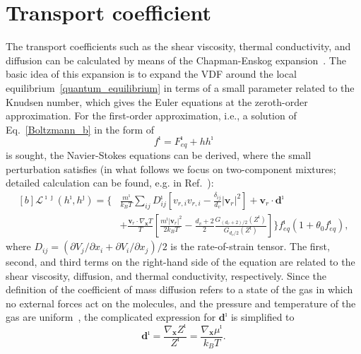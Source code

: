








\section{Transport coefficient}

The transport coefficients such as the shear viscosity, thermal conductivity, and diffusion can be calculated by means of the Chapman-Enskog expansion~\cite{CE}. The basic idea of this expansion is to expand the VDF around the local equilibrium~\eqref{quantum_equilibrium} in terms of a small parameter related to the Knudsen number, which gives the Euler equations at the zeroth-order approximation. For the first-order approximation, i.e., a solution of Eq.~\eqref{Boltzmann_b} in the form of 
\begin{equation}
f^\imath=F^\imath_{eq}+hh^\imath
\end{equation}
is sought, the Navier-Stokes equations can be derived, where the small perturbation satisfies (in what follows we focus on two-component mixtures; detailed calculation can be found, e.g. in Ref.~\cite{Watabe2010}):
\begin{equation*}%
\begin{aligned}[b]
\mathcal{L}^{\imath\jmath}(h^\imath,h^\jmath)=\bigg\{
&\frac{m^\imath}{k_BT}\sum_{ij}D^\imath_{ij}\left[v_{r,i}v_{r,i}-\frac{\delta_{ij}}{d_v}|\textbf{v}_r|^2\right]+\textbf{v}_r\cdot\textbf{d}^\imath\\
&+
\frac{\textbf{v}_{r}\cdot\nabla_\textbf{x}T}{T}\left[\frac{m^\imath|\textbf{v}_r|^2}{2k_BT}-\frac{d_v+2}{2}\frac{G_{(d_v+2)/2}(Z^\imath)}{G_{d_v/2}(Z^\imath)}\right]
\bigg\}f^\imath_{eq}(1+\theta_0f^\imath_{eq}),
\end{aligned}
\end{equation*}
where $D_{ij}=(\partial{V_j}/\partial{x_i}+\partial{V_i}/\partial{x_j})/2$ is the rate-of-strain tensor. The first, second, and third terms on the right-hand side of the equation are related to the shear viscosity, diffusion, and thermal conductivity, respectively. Since the definition of the coefficient of mass diffusion refers to a state of the gas in which no external forces act on the molecules, and the pressure and temperature of the gas are uniform~\cite{CE}, the complicated expression for $\textbf{d}^\imath$ is simplified to~\cite{Watabe2010}
\begin{equation}
\textbf{d}^\imath=\frac{\nabla_\textbf{x}Z^\imath}{Z^\imath}=\frac{\nabla_\textbf{x}\mu^\imath}{k_BT}.
\end{equation}




